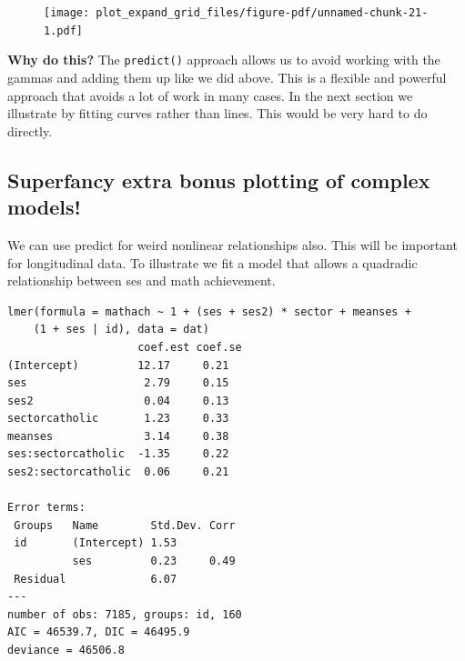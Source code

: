 \documentclass[
  letterpaper,
  DIV=11,
  numbers=noendperiod]{scrreprt}
\newenvironment{Shaded}{\begin{snugshade}}{\end{snugshade}}
\newcommand{\AttributeTok}[1]{\textcolor[rgb]{0.49,0.56,0.16}{#1}}
\newcommand{\DecValTok}[1]{\textcolor[rgb]{0.25,0.63,0.44}{#1}}
\newcommand{\FunctionTok}[1]{\textcolor[rgb]{0.02,0.16,0.49}{#1}}
\newcommand{\NormalTok}[1]{\textcolor[rgb]{0.00,0.44,0.13}{#1}}
\newcommand{\OtherTok}[1]{\textcolor[rgb]{0.00,0.44,0.13}{#1}}
\newcommand{\SpecialCharTok}[1]{\textcolor[rgb]{0.25,0.44,0.63}{#1}}
\begin{document}
\begin{figure}[H]

{\centering \texttt{[image: plot\_expand\_grid\_files/figure-pdf/unnamed-chunk-21-1.pdf]}

}

\end{figure}

\textbf{Why do this?} The \texttt{predict()} approach allows us to avoid
working with the gammas and adding them up like we did above. This is a
flexible and powerful approach that avoids a lot of work in many cases.
In the next section we illustrate by fitting curves rather than lines.
This would be very hard to do directly.

\hypertarget{superfancy-extra-bonus-plotting-of-complex-models}{%
\subsection{Superfancy extra bonus plotting of complex
models!}\label{superfancy-extra-bonus-plotting-of-complex-models}}

We can use predict for weird nonlinear relationships also. This will be
important for longitudinal data. To illustrate we fit a model that
allows a quadradic relationship between ses and math achievement.

\begin{Shaded}
\end{Shaded}

\begin{verbatim}
lmer(formula = mathach ~ 1 + (ses + ses2) * sector + meanses + 
    (1 + ses | id), data = dat)
                    coef.est coef.se
(Intercept)         12.17     0.21  
ses                  2.79     0.15  
ses2                 0.04     0.13  
sectorcatholic       1.23     0.33  
meanses              3.14     0.38  
ses:sectorcatholic  -1.35     0.22  
ses2:sectorcatholic  0.06     0.21  

Error terms:
 Groups   Name        Std.Dev. Corr 
 id       (Intercept) 1.53          
          ses         0.23     0.49 
 Residual             6.07          
---
number of obs: 7185, groups: id, 160
AIC = 46539.7, DIC = 46495.9
deviance = 46506.8 
\end{verbatim}
\end{document}
